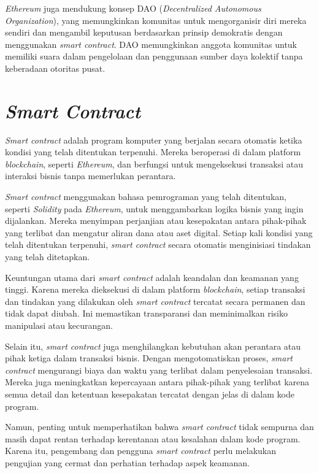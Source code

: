 \emph{Ethereum} juga mendukung konsep DAO (\emph{Decentralized Autonomous Organization}), yang memungkinkan komunitas untuk mengorganisir diri mereka sendiri dan mengambil keputusan berdasarkan prinsip demokratis dengan menggunakan \emph{smart contract}.
DAO memungkinkan anggota komunitas untuk memiliki suara dalam pengelolaan dan penggunaan sumber daya kolektif tanpa keberadaan otoritas pusat. \parencite{ozer2018ethereum}

\section{\emph{Smart Contract}}

\emph{Smart contract} adalah program komputer yang berjalan secara otomatis ketika kondisi yang telah ditentukan terpenuhi. Mereka beroperasi di dalam platform \emph{blockchain}, seperti \emph{Ethereum}, dan berfungsi untuk mengeksekusi
transaksi atau interaksi bisnis tanpa memerlukan perantara. \parencite{antonsopoulos2018mastering}

\emph{Smart contract} menggunakan bahasa pemrograman yang telah ditentukan, seperti \emph{Solidity} pada \emph{Ethereum}, untuk menggambarkan logika bisnis yang ingin dijalankan. Mereka menyimpan perjanjian atau kesepakatan antara
pihak-pihak yang terlibat dan mengatur aliran dana atau aset digital. Setiap kali kondisi yang telah ditentukan terpenuhi, \emph{smart contract} secara otomatis menginisiasi tindakan yang telah ditetapkan.

Keuntungan utama dari \emph{smart contract} adalah keandalan dan keamanan yang tinggi. Karena mereka dieksekusi di dalam platform \emph{blockchain}, setiap transaksi dan tindakan yang dilakukan oleh \emph{smart contract}
tercatat secara permanen dan tidak dapat diubah. Ini memastikan transparansi dan meminimalkan risiko manipulasi atau kecurangan.

Selain itu, \emph{smart contract} juga menghilangkan kebutuhan akan perantara atau pihak ketiga dalam transaksi bisnis. Dengan mengotomatiskan proses, \emph{smart contract} mengurangi biaya dan waktu yang terlibat dalam penyelesaian transaksi.
Mereka juga meningkatkan kepercayaan antara pihak-pihak yang terlibat karena semua detail dan ketentuan kesepakatan tercatat dengan jelas di dalam kode program.

Namun, penting untuk memperhatikan bahwa \emph{smart contract} tidak sempurna dan masih dapat rentan terhadap kerentanan atau kesalahan dalam kode program. Karena itu, pengembang dan pengguna \emph{smart contract} perlu melakukan pengujian yang
cermat dan perhatian terhadap aspek keamanan. \parencite{burniske2019ethereum}

